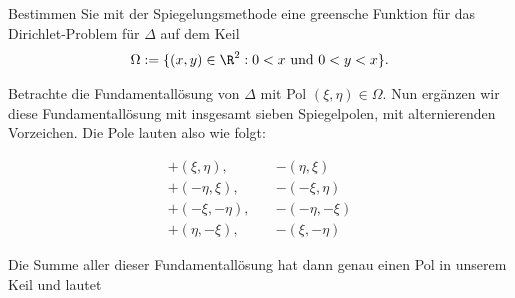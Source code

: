 
\begin{exercise}

Bestimmen Sie mit der Spiegelungsmethode eine greensche Funktion für das
Dirichlet-Problem für $\Delta$ auf dem Keil
\begin{align*}
  \Omega := \{(x,y) \in \R^2: 0 < x \text{ und } 0 < y < x\}.
\end{align*}

\end{exercise}


\begin{solution}

Betrachte die Fundamentallösung von $\Delta$ mit Pol $(\xi,\eta) \in \Omega$.
Nun ergänzen wir diese Fundamentallösung mit insgesamt sieben Spiegelpolen,
mit alternierenden Vorzeichen. Die Pole lauten also wie folgt:

\begin{align*}
  +(\xi,\eta), \quad& -(\eta,\xi) \\
  +(-\eta,\xi), \quad& -(-\xi,\eta) \\
  +(-\xi,-\eta), \quad& -(-\eta,-\xi) \\
  +(\eta,-\xi), \quad& -(\xi,-\eta)
\end{align*}

Die Summe aller dieser Fundamentallösung hat dann genau einen Pol in unserem Keil und lautet


\end{solution}
